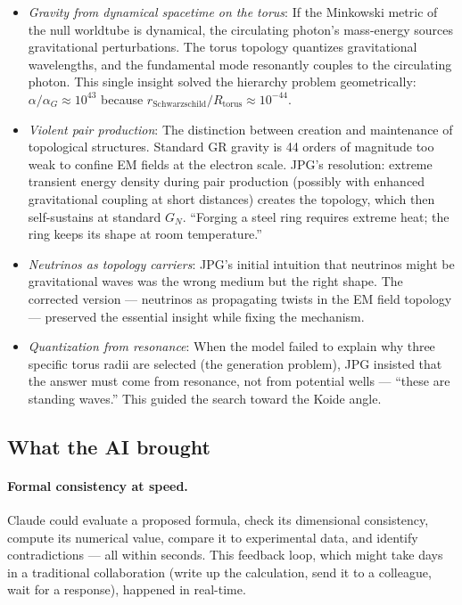 \documentclass[11pt,a4paper]{article}
\begin{document}
\begin{itemize}[leftmargin=*]
  \item \emph{Gravity from dynamical spacetime on the torus}: If the Minkowski metric of the null worldtube is dynamical, the circulating photon's mass-energy sources gravitational perturbations. The torus topology quantizes gravitational wavelengths, and the fundamental mode resonantly couples to the circulating photon. This single insight solved the hierarchy problem geometrically: $\alpha/\alpha_G \approx 10^{43}$ because $r_{\text{Schwarzschild}}/R_{\text{torus}} \approx 10^{-44}$.

  \item \emph{Violent pair production}: The distinction between creation and maintenance of topological structures. Standard GR gravity is 44 orders of magnitude too weak to confine EM fields at the electron scale. JPG's resolution: extreme transient energy density during pair production (possibly with enhanced gravitational coupling at short distances) creates the topology, which then self-sustains at standard $G_N$. ``Forging a steel ring requires extreme heat; the ring keeps its shape at room temperature.''

  \item \emph{Neutrinos as topology carriers}: JPG's initial intuition that neutrinos might be gravitational waves was the wrong medium but the right shape. The corrected version --- neutrinos as propagating twists in the EM field topology --- preserved the essential insight while fixing the mechanism.

  \item \emph{Quantization from resonance}: When the model failed to explain why three specific torus radii are selected (the generation problem), JPG insisted that the answer must come from resonance, not from potential wells --- ``these are standing waves.'' This guided the search toward the Koide angle.
\end{itemize}

\subsection{What the AI brought}

\paragraph{Formal consistency at speed.}
Claude could evaluate a proposed formula, check its dimensional consistency, compute its numerical value, compare it to experimental data, and identify contradictions --- all within seconds. This feedback loop, which might take days in a traditional collaboration (write up the calculation, send it to a colleague, wait for a response), happened in real-time.
\end{document}
